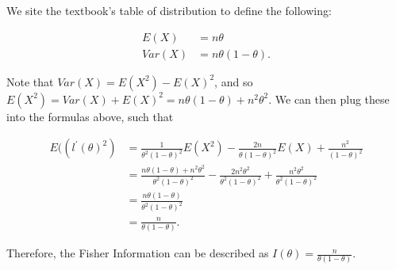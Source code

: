 \documentclass[]{article}
\begin{document}
We site the textbook's table of distribution to define the following:

\begin{align*} 
E(X) &= n \theta \\
Var(X) &= n \theta (1 - \theta).
\end{align*}

Note that \(Var(X) = E(X^2) - E(X) ^2\), and so
\(E(X^2) = Var(X) + E(X)^2 = n\theta(1 - \theta) + n^2 \theta^2\). We
can then plug these into the formulas above, such that

\begin{align*}
E((l^{\prime}(\theta)^2) &= \frac{1}{\theta^2(1 - \theta)^2}E(X^2) - \frac{2n}{\theta(1-\theta)^2}E(X) + \frac{n^2}{(1 - \theta)^2} \\
&= \frac{n\theta(1 - \theta)  + n^2 \theta^2}{\theta^2(1 - \theta)^2} - 
          \frac{2n^2\theta^2}{\theta^2(1-\theta)^2} + 
          \frac{n^2 \theta^2}{\theta^2(1-\theta)^2} \\
&= \frac{n \theta ( 1- \theta)}{\theta^2 ( 1- \theta)^2} \\
&= \frac{n}{\theta(1-\theta)}.
\end{align*}

Therefore, the Fisher Information can be described as
\(I(\theta)=\frac{n}{\theta (1 - \theta)}\).
\end{document}
